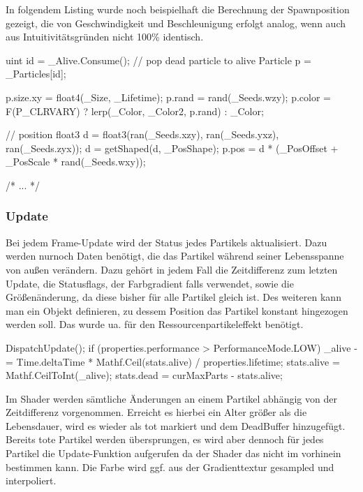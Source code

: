 In folgendem Listing wurde noch beispielhaft die Berechnung der Spawnposition gezeigt, die von Geschwindigkeit und Beschleunigung erfolgt analog, wenn auch aus Intuitivitätsgründen nicht 100\% identisch.

\begin{hlsl}[caption=Compute Emit Kernel]
uint id = _Alive.Consume(); // pop dead particle to alive
Particle p = _Particles[id];

p.size.xy = float4(_Size, _Lifetime);
p.rand = rand(_Seeds.wzy);
p.color = F(P_CLRVARY) ? lerp(_Color, _Color2, p.rand) : _Color;

// position
float3 d = float3(ran(_Seeds.xzy), ran(_Seeds.yxz), ran(_Seeds.zyx));
d = getShaped(d, _PosShape);
p.pos = d * (_PosOffset + _PosScale * rand(_Seeds.wxy));

/* ... */
\end{hlsl}


\subsubsection{Update}

Bei jedem Frame-Update wird der Status jedes Partikels aktualisiert. Dazu werden nurnoch Daten benötigt, die das Partikel während seiner Lebensspanne von au{\ss}en verändern. Dazu gehört in jedem Fall die Zeitdifferenz zum letzten Update, die Statusflags, der Farbgradient falls verwendet, sowie die Grö{\ss}enänderung, da diese bisher für alle Partikel gleich ist. Des weiteren kann man ein Objekt definieren, zu dessem Position das Partikel konstant hingezogen werden soll. Das wurde ua. für den Ressourcenpartikeleffekt benötigt.

\begin{csh}[caption=Controller Update]
DispatchUpdate();
if (properties.performance > PerformanceMode.LOW)
{
    _alive -= Time.deltaTime * Mathf.Ceil(stats.alive) / properties.lifetime;
    stats.alive = Mathf.CeilToInt(_alive);
    stats.dead = curMaxParts - stats.alive;
}
\end{csh}

Im Shader werden sämtliche Änderungen an einem Partikel abhängig von der Zeitdifferenz vorgenommen. Erreicht es hierbei ein Alter größer als die Lebensdauer, wird es wieder als tot markiert und dem DeadBuffer hinzugefügt. Bereits tote Partikel werden übersprungen, es wird aber dennoch für jedes Partikel die Update-Funktion aufgerufen da der Shader das nicht im vorhinein bestimmen kann. Die Farbe wird ggf. aus der Gradienttextur gesampled und interpoliert.

